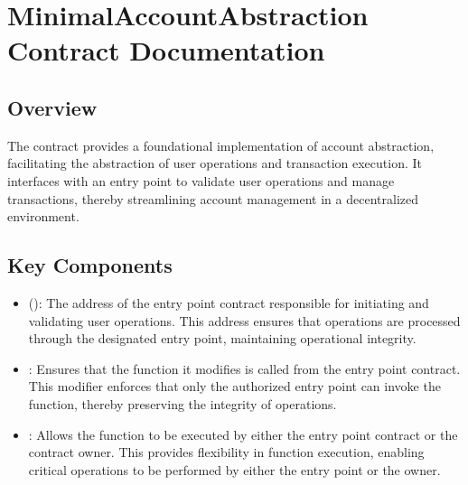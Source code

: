 \documentclass[a4paper,10pt,english]{sphinxmanual}
\begin{document}
\sphinxstepscope


\chapter{MinimalAccountAbstraction Contract Documentation}
\label{\detokenize{docs_minimal_account_abstraction:minimalaccountabstraction-contract-documentation}}\label{\detokenize{docs_minimal_account_abstraction::doc}}

\section{Overview}
\label{\detokenize{docs_minimal_account_abstraction:overview}}
\sphinxAtStartPar
The  contract provides a foundational implementation of account abstraction, facilitating the abstraction of user operations and transaction execution. It interfaces with an entry point to validate user operations and manage transactions, thereby streamlining account management in a decentralized environment.


\section{Key Components}
\label{\detokenize{docs_minimal_account_abstraction:key-components}}
\sphinxAtStartPar
{}
\begin{itemize}
\item {} 
\sphinxAtStartPar
{} ():
The address of the entry point contract responsible for initiating and validating user operations. This address ensures that operations are processed through the designated entry point, maintaining operational integrity.

\end{itemize}

\sphinxAtStartPar
{}
\begin{itemize}
\item {} 
\sphinxAtStartPar
{}:
Ensures that the function it modifies is called from the entry point contract. This modifier enforces that only the authorized entry point can invoke the function, thereby preserving the integrity of operations.

\item {} 
\sphinxAtStartPar
{}:
Allows the function to be executed by either the entry point contract or the contract owner. This provides flexibility in function execution, enabling critical operations to be performed by either the entry point or the owner.

\end{itemize}
\end{document}
